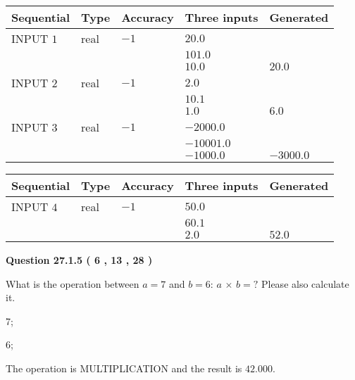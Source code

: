 \documentclass[12pt]{article}
\begin{document}
  
\noindent\begin{tabular}{|l|l|l|l|l|}
\hline
 Sequential & Type & Accuracy & Three inputs & Generated \\ 
\hline
 
 
  INPUT $            1 $ & real & $           -1  $ & $
 20.0
  $ & \\
  & & &  $
 101.0
  $ & \\
  & & &  $
 10.0
 $ & $ 20.0 $ 
 \\  \hline  
 
 
  INPUT $            2 $ & real & $           -1  $ & $
 2.0
  $ & \\
  & & &  $
 10.1
  $ & \\
  & & &  $
 1.0
 $ & $ 6.0 $ 
 \\  \hline  
 
 
  INPUT $            3 $ & real & $           -1  $ & $
 -2000.0
  $ & \\
  & & &  $
 -10001.0
  $ & \\
  & & &  $
 -1000.0
 $ & $ -3000.0 $ 
 \\  \hline  
 \end{tabular}
   
   
  
  
\noindent\begin{tabular}{|l|l|l|l|l|}
\hline
 Sequential & Type & Accuracy & Three inputs & Generated \\ 
\hline
 
 
  INPUT $            4 $ & real & $           -1  $ & $
 50.0
  $ & \\
  & & &  $
 60.1
  $ & \\
  & & &  $
 2.0
 $ & $ 52.0 $ 
 \\  \hline  
 \end{tabular}
   
   
  
\vspace{0.2in}
  
{\textbf{\Large{Question
27.1.5 
 (           6 ,          13 ,          28 )
}}}
  
  
What is the operation between $a= %
7$ and $b= %
6$:
$a$  %
$\times$ $b=?$ Please also calculate it.
 
 
\noindent{}
 
 

7;
 
6;
 
The operation is  %
MULTIPLICATION and the result is
$ %
42.000$.
 
\end{document}
